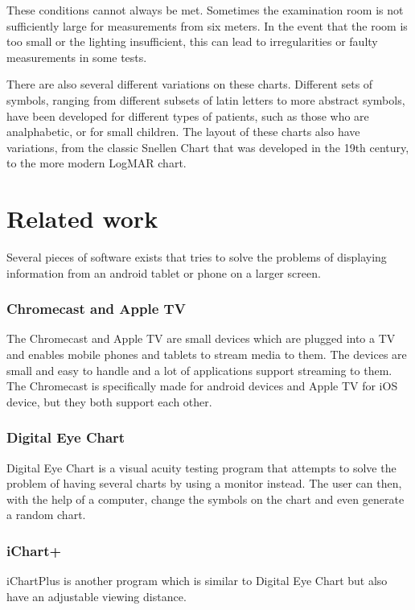 \documentclass[12pt,a4paper,notitlepage]{report}
\begin{document}
These conditions cannot always be met. Sometimes the examination room is not sufficiently large for measurements from six meters. In the event that the room is too small or the lighting insufficient, this can lead to irregularities or faulty measurements in some tests.

There are also several different variations on these charts. Different sets of symbols, ranging from different subsets of latin letters to more abstract symbols, have been developed for different types of patients, such as those who are analphabetic, or for small children. The layout of these charts also have variations, from the classic Snellen Chart that was developed in the 19th century, to the more modern LogMAR chart.

\section{Related work}
Several pieces of software exists that tries to solve the problems of displaying information from an android tablet or phone on a larger screen. 

\subsubsection{Chromecast and Apple TV}
The Chromecast \cite{chromecast} and Apple TV \cite{appletv} are small devices which are plugged into a TV and enables mobile phones and tablets to stream media to them. The devices are small and easy to handle and a lot of applications support streaming to them. The Chromecast is specifically made for android devices and Apple TV for iOS device, but they both support each other.

\subsubsection{Digital Eye Chart}
 Digital Eye Chart \cite{digitaleyechart} is a visual acuity testing program that attempts to solve the problem of having several charts by using a monitor instead. The user can then, with the help of a computer, change the symbols on the chart and even generate a random chart. 

\subsubsection{iChart+}
iChartPlus \cite{ichartplus} is another program which is similar to Digital Eye Chart but also have an adjustable viewing distance. 
\end{document}
